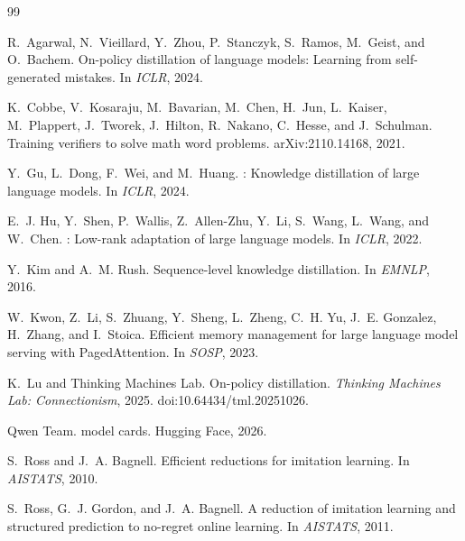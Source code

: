 \documentclass[11pt,a4paper]{article}
\begin{document}
\begin{thebibliography}{99}
\setlength{\itemsep}{1pt}
\small

R.~Agarwal, N.~Vieillard, Y.~Zhou, P.~Stanczyk, S.~Ramos, M.~Geist, and
O.~Bachem.
\newblock On-policy distillation of language models: Learning from
self-generated mistakes.
\newblock In \emph{ICLR}, 2024.

K.~Cobbe, V.~Kosaraju, M.~Bavarian, M.~Chen, H.~Jun, L.~Kaiser, M.~Plappert,
J.~Tworek, J.~Hilton, R.~Nakano, C.~Hesse, and J.~Schulman.
\newblock Training verifiers to solve math word problems.
\newblock arXiv:2110.14168, 2021.

Y.~Gu, L.~Dong, F.~Wei, and M.~Huang.
: Knowledge distillation of large language models.
\newblock In \emph{ICLR}, 2024.

E.~J. Hu, Y.~Shen, P.~Wallis, Z.~Allen-Zhu, Y.~Li, S.~Wang, L.~Wang, and
W.~Chen.
: Low-rank adaptation of large language models.
\newblock In \emph{ICLR}, 2022.

Y.~Kim and A.~M. Rush.
\newblock Sequence-level knowledge distillation.
\newblock In \emph{EMNLP}, 2016.

W.~Kwon, Z.~Li, S.~Zhuang, Y.~Sheng, L.~Zheng, C.~H. Yu, J.~E. Gonzalez,
H.~Zhang, and I.~Stoica.
\newblock Efficient memory management for large language model serving with
{PagedAttention}.
\newblock In \emph{SOSP}, 2023.

K.~Lu and Thinking Machines Lab.
\newblock On-policy distillation.
\newblock \emph{Thinking Machines Lab: Connectionism}, 2025.
\newblock doi:10.64434/tml.20251026.

Qwen Team.
 model cards.
\newblock Hugging Face, 2026.

S.~Ross and J.~A. Bagnell.
\newblock Efficient reductions for imitation learning.
\newblock In \emph{AISTATS}, 2010.

S.~Ross, G.~J. Gordon, and J.~A. Bagnell.
\newblock A reduction of imitation learning and structured prediction to
no-regret online learning.
\newblock In \emph{AISTATS}, 2011.


\end{thebibliography}
\end{document}
